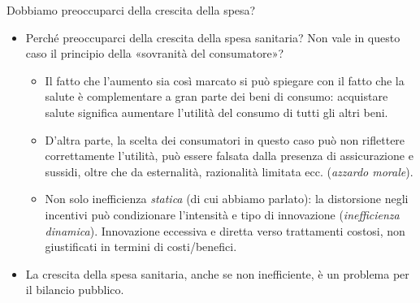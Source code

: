 \documentclass[aspectratio=64,12pt]{beamer}
\begin{document}
\begin{frame}{Dobbiamo preoccuparci della crescita della spesa?}
\begin{itemize}
\item Perché preoccuparci della crescita della spesa sanitaria? Non vale in
questo caso il principio della «sovranità del consumatore»?
\begin{itemize}
\item Il fatto che l'aumento sia così marcato si può spiegare con il fatto che la
salute è complementare a gran parte dei beni di consumo: acquistare salute
significa aumentare l'utilità del consumo di tutti gli altri beni.
\item D'altra parte, la scelta dei consumatori in questo caso può non
riflettere correttamente l'utilità, può essere falsata dalla presenza di
assicurazione e sussidi, oltre che da esternalità, razionalità limitata
ecc. (\emph{azzardo morale}).
\item Non solo inefficienza \emph{statica} (di cui abbiamo parlato): la distorsione
negli incentivi può condizionare l'intensità e tipo di innovazione
(\emph{inefficienza dinamica}). Innovazione eccessiva e diretta verso trattamenti
costosi, non giustificati in termini di costi/benefici.
\end{itemize}
\item La crescita della spesa sanitaria, anche se non inefficiente, è un
  problema per il bilancio pubblico.
\end{itemize}
\end{frame}
\end{document}
